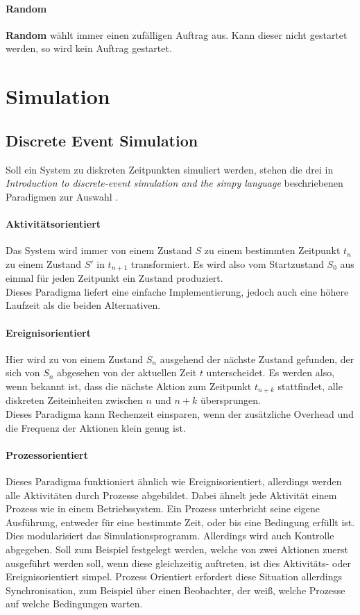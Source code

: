 \paragraph{Random}
\textbf{Random} wählt immer einen zufälligen Auftrag aus. Kann dieser nicht gestartet werden, so wird kein Auftrag gestartet.

\section{Simulation}

\subsection{Discrete Event Simulation}
Soll ein System zu diskreten Zeitpunkten simuliert werden, stehen die drei in \emph{Introduction to discrete-event simulation and the simpy language} beschriebenen Paradigmen zur Auswahl \cite{SimPy}.
\label{paradigma}
\paragraph{Aktivitätsorientiert}
\label{activity}
Das System wird immer von einem Zustand $S$ zu einem bestimmten Zeitpunkt $t_n$ zu einem Zustand $S'$ in $t_{n+1}$ transformiert. Es wird also vom Startzustand $S_0$ aus einmal für jeden Zeitpunkt ein Zustand produziert.\\
Dieses Paradigma liefert eine einfache Implementierung, jedoch auch eine höhere Laufzeit als die beiden Alternativen.
\paragraph{Ereignisorientiert}
Hier wird zu von einem Zustand $S_n$ ausgehend der nächste Zustand gefunden, der sich von $S_n$ abgesehen von der aktuellen Zeit $t$ unterscheidet. Es werden also, wenn bekannt ist, dass die nächste Aktion zum Zeitpunkt $t_{n+k}$ stattfindet, alle diskreten Zeiteinheiten zwischen $n$ und $n+k$ übersprungen.\\
Dieses Paradigma kann Rechenzeit einsparen, wenn der zusätzliche Overhead und die Frequenz der Aktionen klein genug ist.
\paragraph{Prozessorientiert}
Dieses Paradigma funktioniert ähnlich wie Ereignisorientiert, allerdings werden alle Aktivitäten durch Prozesse abgebildet. Dabei ähnelt jede Aktivität einem Prozess wie in einem Betriebssystem. Ein Prozess unterbricht seine eigene Ausführung, entweder für eine bestimmte Zeit, oder bis eine Bedingung erfüllt ist.\\
Dies modularisiert das Simulationsprogramm. Allerdings wird auch Kontrolle abgegeben. Soll zum Beispiel festgelegt werden, welche von zwei Aktionen zuerst ausgeführt werden soll, wenn diese gleichzeitig auftreten, ist dies Aktivitäts- oder Ereignisorientiert simpel. Prozess Orientiert erfordert diese Situation allerdings Synchronisation, zum Beispiel über einen Beobachter, der weiß, welche Prozesse auf welche Bedingungen warten.


